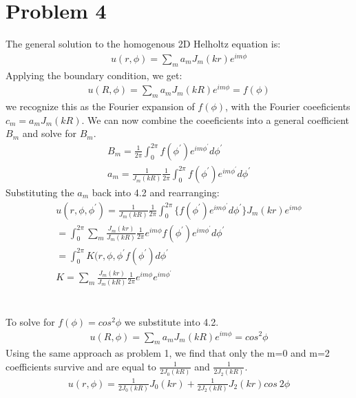 \documentclass[a4paper,10pt]{article}
\numberwithin{equation}{section}
\begin{document}
\section{Problem 4}
The general solution to the homogenous 2D Helholtz equation is:
\begin{gather}
 u(r,\phi)=\sum_m a_mJ_m(kr)e^{im\phi}
\end{gather}
Applying the boundary condition, we get:
\begin{gather}
 u(R,\phi)=\sum_m a_mJ_m(kR)e^{im\phi}=f(\phi)
\end{gather}
we recognize this as the Fourier expansion of $f(\phi)$, with the Fourier coeeficients $c_m=a_mJ_m(kR)$.
We can now combine the coeeficients into a general coefficient $B_m$ and solve for $B_m$.
\begin{gather}
 B_m=\frac{1}{2\pi}\int_0^{2\pi}f(\phi^{'})e^{im\phi^{'}}d\phi^{'}\\
 a_m=\frac{1}{J_m(kR)}\frac{1}{2\pi}\int_0^{2\pi}f(\phi^{'})e^{im\phi^{'}}d\phi^{'}
\end{gather}
Substituting the $a_m$ back into 4.2 and rearranging:
\begin{gather}
 u(r,\phi,\phi^{'})=\frac{1}{J_m(kR)}\frac{1}{2\pi}\int_0^{2\pi}\{f(\phi^{'})e^{im\phi^{'}}d\phi^{'}\}J_m(kr)e^{im\phi}\\
 =\int_0^{2\pi}\sum_m\frac{J_m(kr)}{J_m(kR)}\frac{1}{2\pi}e^{im\phi}f(\phi^{'})e^{im\phi^{'}}d\phi^{'}\\
 =\int_0^{2\pi}K(r,\phi,\phi^{'}f(\phi^{'})d\phi^{'}\\
 K=\sum_m\frac{J_m(kr)}{J_m(kR)}\frac{1}{2\pi}e^{im\phi}e^{im\phi^{'}}
\end{gather}
\\ \\
To solve for $f(\phi)=cos^2\phi$ we substitute into 4.2.
\begin{gather}
 u(R,\phi)=\sum_m a_mJ_m(kR)e^{im\phi}=cos^2\phi
\end{gather}
Using the same approach as problem 1, we find that only the m=0 and m=2 coefficients survive and are equal to $\frac{1}{2J_0(kR)}$ and $\frac{1}{2J_2(kR)}$.
\begin{gather}
 u(r,\phi)=\frac{1}{2J_0(kR)}J_0(kr)+\frac{1}{2J_2(kR)}J_2(kr)cos\ 2\phi
\end{gather}
\end{document}
